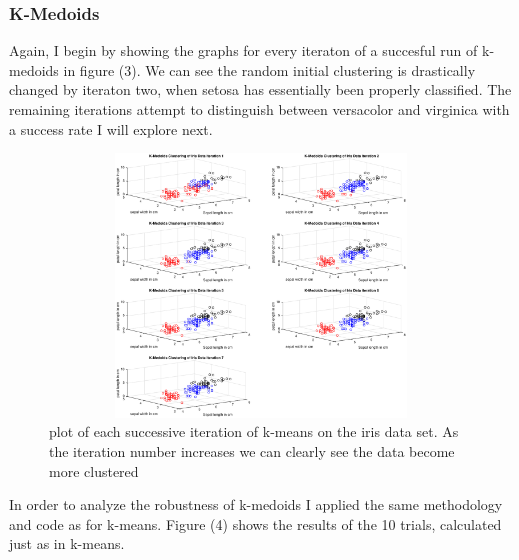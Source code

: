 \documentclass{article}
\begin{document}
    \subsubsection*{K-Medoids}
    Again, I begin by showing the graphs for every iteraton of a succesful run of k-medoids in figure (3).  We can see the random initial clustering is drastically changed by iteraton two, when setosa has essentially been properly classified.  The remaining iterations attempt to distinguish between versacolor and virginica with a success rate I will explore next.  \\
    \begin{figure}[h!]
    \centerline
    {
    \includegraphics[width=15cm, height=7cm] {kmedoids_iterations}
    }
    \caption{\label{fig:my figure} plot of each successive iteration of k-means on the iris data set.  As the iteration number increases we can clearly see the data become more clustered }
    \end{figure}
    
    
    In order to analyze the robustness of k-medoids I applied the same methodology and code as for k-means.  Figure (4) shows the results of the 10 trials, calculated just as in k-means.  \\
    
\end{document}

